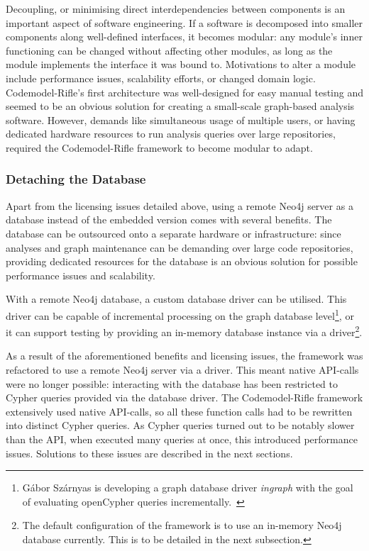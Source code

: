 Decoupling, or minimising direct interdependencies between components is an important aspect of software engineering. If a software is decomposed into smaller components along well-defined interfaces, it becomes modular: any module's inner functioning can be changed without affecting other modules, as long as the module implements the interface it was bound to. Motivations to alter a module include performance issues, scalability efforts, or changed domain logic. Codemodel-Rifle's first architecture was well-designed for easy manual testing and seemed to be an obvious solution for creating a small-scale graph-based analysis software. However, demands like simultaneous usage of multiple users, or having dedicated hardware resources to run analysis queries over large repositories, required the Codemodel-Rifle framework to become modular to adapt.


\subsubsection{Detaching the Database}

Apart from the licensing issues detailed above, using a remote Neo4j server as a database instead of the embedded version comes with several benefits. The database can be outsourced onto a separate hardware or infrastructure: since analyses and graph maintenance can be demanding over large code repositories, providing dedicated resources for the database is an obvious solution for possible performance issues and scalability.

With a remote Neo4j database, a custom database driver can be utilised. This driver can be capable of incremental processing on the graph database level\footnote{Gábor Szárnyas is developing a graph database driver \emph{ingraph} with the goal of evaluating openCypher queries incrementally.~\cite{ingraph-github}}, or it can support testing by providing an in-memory database instance via a driver\footnote{The default configuration of the framework is to use an in-memory Neo4j database currently. This is to be detailed in the next subsection.}.

As a result of the aforementioned benefits and licensing issues, the framework was refactored to use a remote Neo4j server via a driver. This meant native API-calls were no longer possible: interacting with the database has been restricted to Cypher queries provided via the database driver. The Codemodel-Rifle framework extensively used native API-calls, so all these function calls had to be rewritten into distinct Cypher queries. As Cypher queries turned out to be notably slower than the API, when executed many queries at once, this introduced performance issues. Solutions to these issues are described in the next sections.


